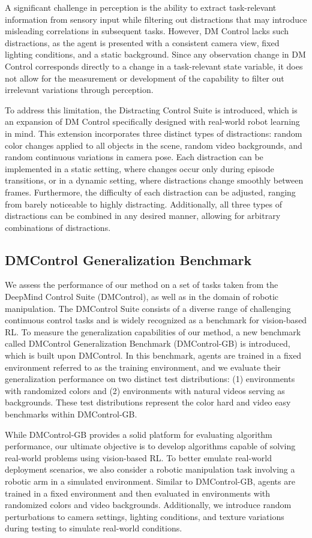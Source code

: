A significant challenge in perception is the ability to extract task-relevant information from sensory input while filtering out distractions that may introduce misleading correlations in subsequent tasks. However, DM Control lacks such distractions, as the agent is presented with a consistent camera view, fixed lighting conditions, and a static background. Since any observation change in DM Control corresponds directly to a change in a task-relevant state variable, it does not allow for the measurement or development of the capability to filter out irrelevant variations through perception.

To address this limitation, the Distracting Control Suite is introduced, which is an expansion of DM Control specifically designed with real-world robot learning in mind. This extension incorporates three distinct types of distractions: random color changes applied to all objects in the scene, random video backgrounds, and random continuous variations in camera pose. Each distraction can be implemented in a static setting, where changes occur only during episode transitions, or in a dynamic setting, where distractions change smoothly between frames. Furthermore, the difficulty of each distraction can be adjusted, ranging from barely noticeable to highly distracting. Additionally, all three types of distractions can be combined in any desired manner, allowing for arbitrary combinations of distractions.

\newpage
\subsection{DMControl Generalization Benchmark\cite{hansen2021softda}}
We assess the performance of our method on a set of tasks taken from the DeepMind Control Suite (DMControl), as well as in the domain of robotic manipulation. The DMControl Suite consists of a diverse range of challenging continuous control tasks and is widely recognized as a benchmark for vision-based RL. To measure the generalization capabilities of our method, a new benchmark called DMControl Generalization Benchmark (DMControl-GB) is introduced, which is built upon DMControl. In this benchmark, agents are trained in a fixed environment referred to as the training environment, and we evaluate their generalization performance on two distinct test distributions: (1) environments with randomized colors and (2) environments with natural videos serving as backgrounds. These test distributions represent the color hard and video easy benchmarks within DMControl-GB.

While DMControl-GB provides a solid platform for evaluating algorithm performance, our ultimate objective is to develop algorithms capable of solving real-world problems using vision-based RL. To better emulate real-world deployment scenarios, we also consider a robotic manipulation task involving a robotic arm in a simulated environment. Similar to DMControl-GB, agents are trained in a fixed environment and then evaluated in environments with randomized colors and video backgrounds. Additionally, we introduce random perturbations to camera settings, lighting conditions, and texture variations during testing to simulate real-world conditions.